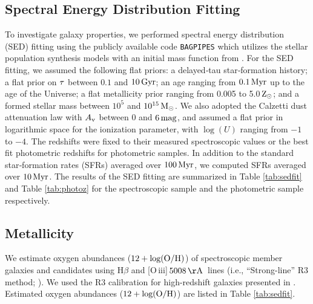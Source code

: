 \documentclass[twocolumn]{aastex631}
\def\Oiiilong{[O\,{\sc iii}]\,$5008\,{\rm \AA}$}
\begin{document}


\subsection{Spectral Energy Distribution Fitting}
\label{sec:sedfit}

To investigate galaxy properties, we performed spectral energy distribution (SED) fitting using the publicly available code \texttt{BAGPIPES} \citep[][]{Carnall2018} which utilizes the \citet{Bruzual2003} stellar population synthesis models with an initial mass function from \citet{Kroupa2001}.
For the SED fitting, we assumed the following flat priors: a delayed‑tau star‑formation history; a flat prior on ${\rm \tau}$ between $0.1$ and $10\,{\rm Gyr}$; an age ranging from $0.1\,{\rm Myr}$ up to the age of the Universe; a flat metallicity prior ranging from 0.005 to 5.0\,${\rm Z_{\odot}}$; and a formed stellar mass between $10^{5}$ and $10^{15}\,{\rm M_{\odot}}$.
We also adopted the Calzetti dust attenuation law \citep{Calzetti2000} with $A_{\rm v}$ between $0$ and $6\,{\rm mag}$, and assumed a flat prior in logarithmic space for the ionization parameter, with $\log(U)$ ranging from $-1$ to $-4$. The redshifts were fixed to their measured spectroscopic values or the best fit photometric redshifts for photometric samples. In addition to the standard star‑formation rates (SFRs) averaged over $100\,{\rm Myr}$, we computed SFRs averaged over $10\,{\rm Myr}$. The results of the SED fitting are summarized in Table \ref{tab:sedfit} and Table \ref{tab:photoz} for the spectroscopic sample and the photometric sample respectively.

\subsection{Metallicity}

We estimate oxygen abundances ($12+{\rm log(O/H)}$) of spectroscopic member galaxies and candidates using H$\beta$ and \Oiiilong\ lines (i.e., ``Strong-line'' R3 method; \citealt{Kewley2002}). We used the R3 calibration for high-redshift galaxies presented in \citep[][]{Curti2024}. Estimated oxygen abundances ($12+{\rm log(O/H)}$) are listed in Table \ref{tab:sedfit}.
\end{document}
